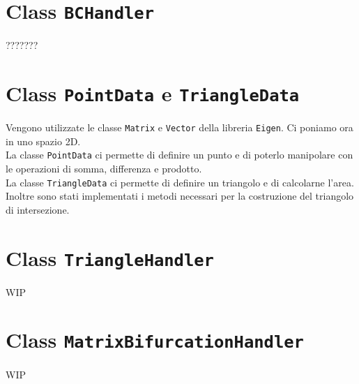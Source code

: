 \section{Class \texttt{BCHandler}}

???????

\section{Class \texttt{PointData} e \texttt{TriangleData}}

Vengono utilizzate le classe \texttt{Matrix} e \texttt{Vector} della libreria \texttt{Eigen}.
Ci poniamo ora in uno spazio 2D.\\
La classe \texttt{PointData} ci permette di definire un punto e di poterlo manipolare con le operazioni di somma, differenza e prodotto.\\
La classe \texttt{TriangleData} ci permette di definire un triangolo e di calcolarne l'area. Inoltre sono stati implementati i metodi necessari per la costruzione del triangolo di intersezione.

\section{Class \texttt{TriangleHandler}  }


WIP

\section{Class \texttt{MatrixBifurcationHandler}}


WIP


